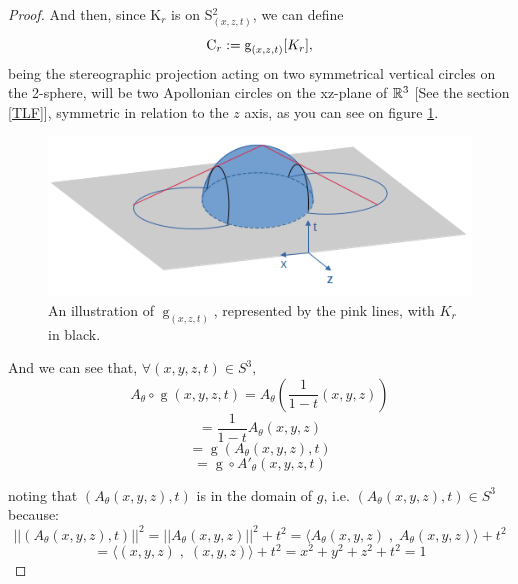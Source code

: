 \begin{proof}
And then, since K$_{r}$ is on S$^2_{(x,z,t)}$, we can define
\begin{equation*}
\operatorname{C}_{r} := \operatorname{g}_{(x,z,t)}[K_{r}],    
\end{equation*}
being the stereographic projection acting on two symmetrical vertical circles on the 2-sphere, will be two Apollonian circles on the xz-plane of $\mathbb{R}^3$ [See the section \ref{TLF}], symmetric in relation to the $z$ axis, as you can see on figure \ref{fig:oi}. %

\begin{figure}[H]
    \centering
    \includegraphics[scale=0.35]{projest.png}
    \caption{An illustration of $\operatorname{g}_{(x,z,t)}$, represented by the pink lines, with $K_{r}$ in black.}
    \label{fig:oi}
\end{figure}

And we can see that, $\forall (x,y,z,t) \in S^3,$
\begin{equation*}
    A_{\theta} \circ \operatorname{g}(x,y,z,t) = A_{\theta} \left(\frac{1}{1-t}(x,y,z)\right)
\end{equation*}
\begin{equation*}
    = \frac{1}{1-t} A_{\theta}(x,y,z)
\end{equation*}
\begin{equation*}
    = \operatorname{g}(A_{\theta}(x,y,z),t)
\end{equation*}
\begin{equation*}
    = \operatorname{g}\circ A'_{\theta}(x,y,z,t) 
\end{equation*}

noting that $(A_{\theta}(x,y,z),t)$ is in the domain of $g$, i.e. $(A_{\theta}(x,y,z),t) \in S^3$ because:
\begin{equation*}
    ||(A_{\theta}(x,y,z),t)||^2 = ||A_{\theta}(x,y,z)||^2 + t^2 = \langle A_{\theta}(x,y,z) \; , \; A_{\theta}(x,y,z) \rangle + t^2 
\end{equation*}
\begin{equation*}
    = \langle (x,y,z) \; , \; (x,y,z) \rangle + t^2 = x^2 + y^2 + z^2 + t^2 = 1
\end{equation*}


\end{proof}
